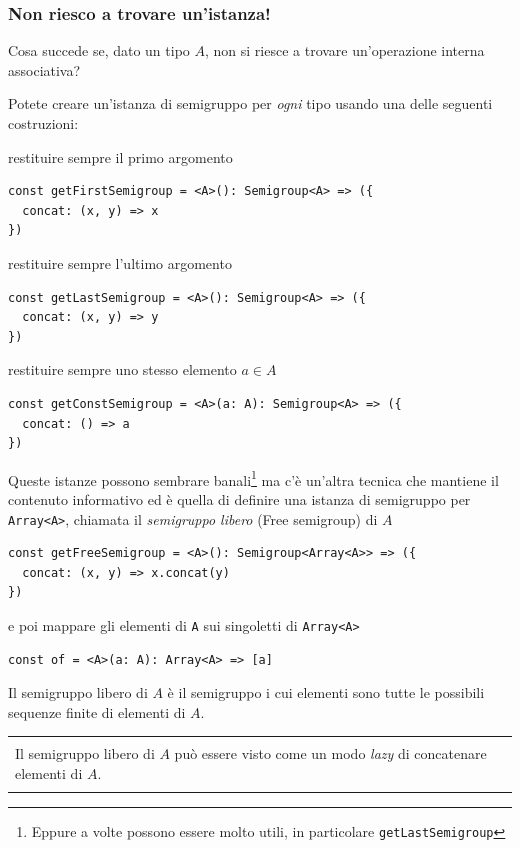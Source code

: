 \documentclass[12pt]{article}
\newenvironment{boxed}
    {\begin{center}
    \begin{tabular}{|p{0.9\textwidth}|}
    \hline\\
    }
    {
    \\\\\hline
    \end{tabular}
    \end{center}
    }
\begin{document}
\subsubsection{Non riesco a trovare un'istanza!}

Cosa succede se, dato un tipo $A$, non si riesce a trovare un'operazione interna associativa?

Potete creare un'istanza di semigruppo per \emph{ogni} tipo usando una delle seguenti costruzioni:

restituire sempre il primo argomento

\begin{verbatim}
const getFirstSemigroup = <A>(): Semigroup<A> => ({
  concat: (x, y) => x
})
\end{verbatim}

restituire sempre l'ultimo argomento

\begin{verbatim}
const getLastSemigroup = <A>(): Semigroup<A> => ({
  concat: (x, y) => y
})
\end{verbatim}

restituire sempre uno stesso elemento $a \in A$

\begin{verbatim}
const getConstSemigroup = <A>(a: A): Semigroup<A> => ({
  concat: () => a
})
\end{verbatim}

Queste istanze possono sembrare banali\footnote{Eppure a volte possono essere molto utili, in particolare \texttt{getLastSemigroup}}
ma c'è un'altra tecnica che mantiene il contenuto informativo ed è quella di definire una istanza di semigruppo per \texttt{Array<A>},
chiamata il \emph{semigruppo libero} (Free semigroup) di $A$

\begin{verbatim}
const getFreeSemigroup = <A>(): Semigroup<Array<A>> => ({
  concat: (x, y) => x.concat(y)
})
\end{verbatim}

e poi mappare gli elementi di \texttt{A} sui singoletti di \texttt{Array<A>}

\begin{verbatim}
const of = <A>(a: A): Array<A> => [a]
\end{verbatim}

Il semigruppo libero di $A$ è il semigruppo i cui elementi sono tutte le possibili sequenze finite di elementi di $A$.

\begin{boxed}
Il semigruppo libero di $A$ può essere visto come un modo \emph{lazy} di concatenare elementi di $A$.
\end{boxed}
\end{document}
